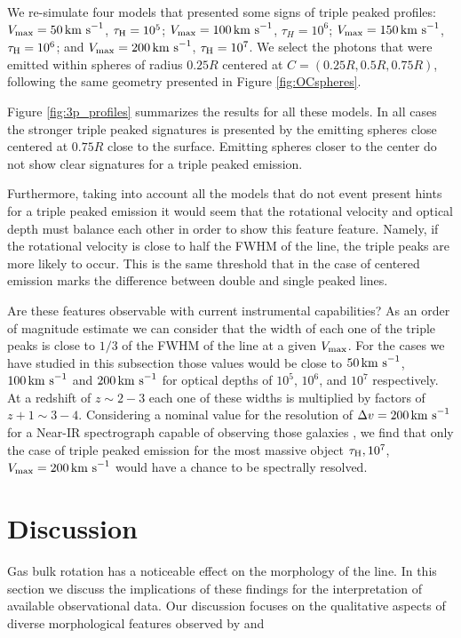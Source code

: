 \documentclass{emulateapj}
\newcommand{\ly}{{\ifmmode{{\rm Ly}\alpha~}\else{Ly$\alpha$~}\fi}}
\newcommand{\kms}{{\ifmmode{{\mathrm{\,km\ s}^{-1}}}\else{\,km~s$^{-1}$}\fi}}
\begin{document}
We re-simulate four models that presented some signs of triple peaked
profiles: $V_{\rm max}=50\kms$, $\tau_{\rm H}=10^{5}$; $V_{\rm
  max}=100\kms$, $\tau_{H}=10^{6}$; $V_{\rm max}=150\kms$, $\tau_{\rm
  H}=10^6$; and $V_{\rm max}=200\kms$, $\tau_{\rm H}=10^{7}$. We
select the photons that were emitted within spheres of radius $0.25R$
centered at $C=(0.25R, 0.5R, 0.75R)$, following the same
geometry presented in Figure \ref{fig:OCspheres}.

Figure \ref{fig:3p_profiles} summarizes the results for all these
models. In all cases the stronger triple peaked signatures is
presented by the emitting spheres close centered at $0.75R$ close to
the surface. Emitting spheres closer to the center do not show clear
signatures for a triple peaked emission.

Furthermore, taking into account all the models that do not event present hints for
a triple peaked emission it would seem that the rotational velocity
and optical depth must balance each other in order to show this feature
feature. Namely, if the rotational velocity is close to half the FWHM
of the line, the triple peaks are more likely to occur. This is the
same threshold that in the case of centered emission marks the
difference between double and single peaked lines.


Are these features observable with current instrumental capabilities?
As an order of magnitude estimate we can consider that the width of
each one of the triple peaks is close to $1/3$ of the FWHM of the line
at a given $V_{\rm max}$. For the cases we have studied in this
subsection those values would be close to $50\kms$, $100\kms$ and
$200\kms$ for optical depths of $10^5$, $10^6$, and $10^7$
respectively. At a redshift of $z\sim 2-3$ each one of these widths
is multiplied by factors of $z+1\sim 3-4$. Considering a nominal value
for the resolution of $\Delta v=200\kms$ for a Near-IR spectrograph capable of observing
those galaxies \citep{Kulas12}, we find that only the case of triple
peaked emission for the most massive object $\tau_{\rm H}, 10^{7}$,
$V_{\rm max}=200\kms$ would have a chance to be spectrally resolved. 


\section{Discussion}
\label{sec:discussion}

Gas bulk rotation has a noticeable effect on the morphology of the
 \ly line. In this section we discuss the implications of these
 findings for the interpretation of available observational data. Our
 discussion focuses on the qualitative aspects of diverse
 morphological features observed by \cite{Kulas12} and \cite{Yamada2012}
\end{document}
